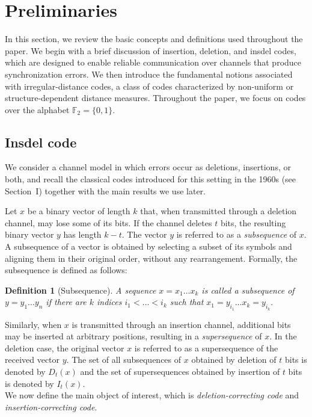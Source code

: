 \documentclass[11 pt]{article}
\numberwithin{equation}{section}
\newtheorem{definition}[theorem]{Definition}
\begin{document}
\section{Preliminaries}
    In this section, we review the basic concepts and definitions used throughout the paper. We begin with a brief discussion of insertion, deletion, and insdel codes, which are designed to enable reliable communication over channels that produce synchronization errors. We then introduce the fundamental notions associated with irregular-distance codes, a class of codes characterized by non-uniform or structure-dependent distance measures. Throughout the paper, we focus on codes over the alphabet $\mathbb{F}_2 = \{0,1\}$.
 \subsection{Insdel code}
     We consider a channel model in which errors occur as deletions, insertions, or both, and recall the classical codes introduced for this setting in the 1960s (see Section~I) together with the main results we use later.

    Let $x$ be a binary vector of length $k$ that, when transmitted through a deletion channel, may lose some of its bits. 
    If the channel deletes $t$ bits, the resulting binary vector $y$ has length $k - t$. 
    The vector $y$ is referred to as a \textit{subsequence} of $x$. 
    A subsequence of a vector is obtained by selecting a subset of its symbols and aligning them in their original order, 
    without any rearrangement. 
    Formally, the subsequence is defined as follows:

    \begin{definition}[Subsequence]
        A sequence $x = x_1 \ldots x_k$ is called a subsequence of $y = y_1 \ldots y_n$ if there are $k$ indices $i_1 < \ldots < i_k$ such that $x_1 = y_{i_1} \ldots x_k = y_{i_k}.$
    \end{definition}

    Similarly, when $x$ is transmitted through an insertion channel, additional bits may be inserted at arbitrary positions, 
    resulting in a \textit{supersequence} of $x$. 
    In the deletion case, the original vector $x$ is referred to as a supersequence of the received vector $y$.
    The set of all subsequences of $x$ obtained by deletion of $t$ bits is denoted by $D_t(x)$ and the set of supersequences obtained by insertion of $t$ bits is denoted by $I_t(x)$.\\
    We now define the main object of interest, which is \textit{deletion-correcting code} and \textit{insertion-correcting code}.
\end{document}
